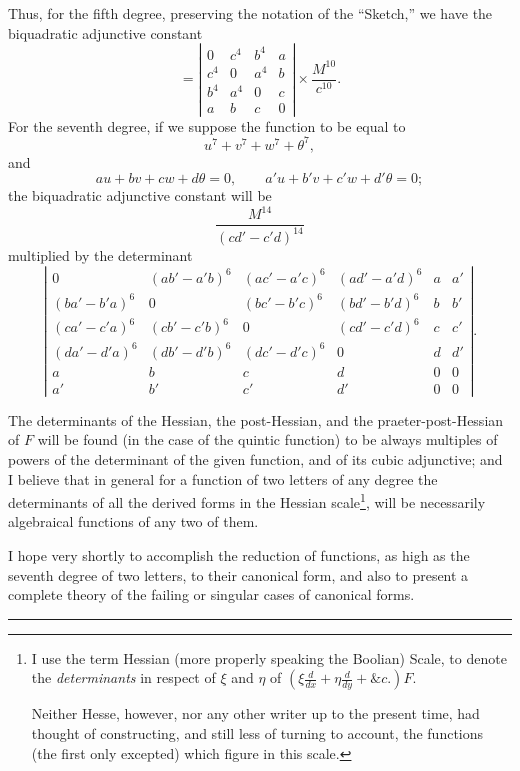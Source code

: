 \documentclass[11pt]{article}
\newcommand{\sourcepage}[1]{\marginpar{\scriptsize p.~#1}}
\begin{document}
{{Thus, for the fifth degree, preserving the notation of the ``Sketch,'' we have the biquadratic adjunctive constant
\[
 =
 \left|
 \begin{array}{cccc}
 0&c^4&b^4&a\\
 c^4&0&a^4&b\\
 b^4&a^4&0&c\\
 a&b&c&0
 \end{array}
 \right|
 \times \frac{M^{10}}{c^{10}}.
\]
For the seventh degree, if we suppose the function to be equal to
\[
 u^7+v^7+w^7+\theta^7,
\]
and
\[
 au+bv+cw+d\theta=0,\qquad
 a'u+b'v+c'w+d'\theta=0;
\]
the biquadratic adjunctive constant will be
\[
 \frac{M^{14}}{(cd'-c'd)^{14}}
\]
multiplied by the determinant
{\small
\[
\left|
\begin{array}{cccccc}
0&(ab'-a'b)^6&(ac'-a'c)^6&(ad'-a'd)^6&a&a'\\
(ba'-b'a)^6&0&(bc'-b'c)^6&(bd'-b'd)^6&b&b'\\
(ca'-c'a)^6&(cb'-c'b)^6&0&(cd'-c'd)^6&c&c'\\
(da'-d'a)^6&(db'-d'b)^6&(dc'-d'c)^6&0&d&d'\\
a&b&c&d&0&0\\
a'&b'&c'&d'&0&0
\end{array}
\right|.
\]
}

\sourcepage{208}
The determinants of the Hessian, the post-Hessian, and the praeter-post-Hessian of $F$ will be found (in the case of the quintic function) to be always multiples of powers of the determinant of the given function, and of its cubic adjunctive; and I believe that in general for a function of two letters of any degree the determinants of all the derived forms in the Hessian scale\footnote{I use the term Hessian (more properly speaking the Boolian) Scale, to denote the \emph{determinants} in respect of $\xi$ and $\eta$ of $\left(\xi\frac{d}{dx}+\eta\frac{d}{dy}+\&c.\right)F$.

Neither Hesse, however, nor any other writer up to the present time, had thought of constructing, and still less of turning to account, the functions (the first only excepted) which figure in this scale.}, will be necessarily algebraical functions of any two of them.

I hope very shortly to accomplish the reduction of functions, as high as the seventh degree of two letters, to their canonical form, and also to present a complete theory of the failing or singular cases of canonical forms.

\begin{center}\rule{1.5in}{0.4pt}\end{center}

}}
\end{document}
